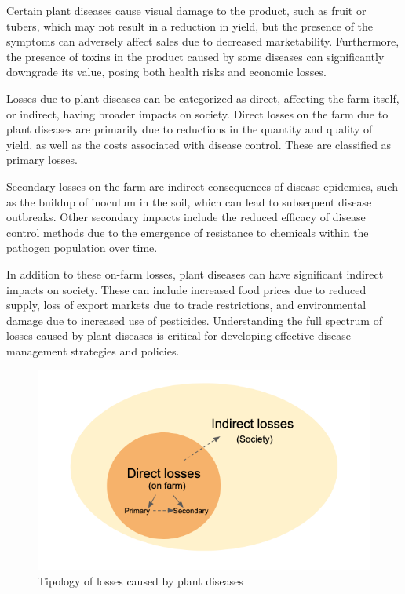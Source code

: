 \documentclass[
  letterpaper,
]{book}
\begin{document}
Certain plant diseases cause visual damage to the product, such as fruit
or tubers, which may not result in a reduction in yield, but the
presence of the symptoms can adversely affect sales due to decreased
marketability. Furthermore, the presence of toxins in the product caused
by some diseases can significantly downgrade its value, posing both
health risks and economic losses.

Losses due to plant diseases can be categorized as direct, affecting the
farm itself, or indirect, having broader impacts on society. Direct
losses on the farm due to plant diseases are primarily due to reductions
in the quantity and quality of yield, as well as the costs associated
with disease control. These are classified as primary losses.

Secondary losses on the farm are indirect consequences of disease
epidemics, such as the buildup of inoculum in the soil, which can lead
to subsequent disease outbreaks. Other secondary impacts include the
reduced efficacy of disease control methods due to the emergence of
resistance to chemicals within the pathogen population over time.

In addition to these on-farm losses, plant diseases can have significant
indirect impacts on society. These can include increased food prices due
to reduced supply, loss of export markets due to trade restrictions, and
environmental damage due to increased use of pesticides. Understanding
the full spectrum of losses caused by plant diseases is critical for
developing effective disease management strategies and policies.

\begin{figure}

{\centering \includegraphics[width=5.96875in,height=\textheight]{imgs/loss_diagram.png}

}

\caption{\label{fig-losses}Tipology of losses caused by plant diseases}

\end{figure}
\end{document}
